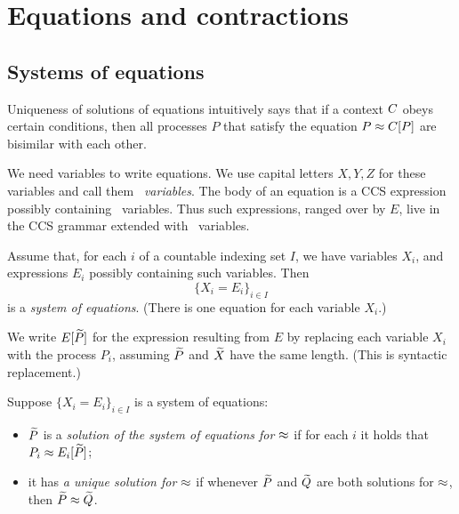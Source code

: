 \section{Equations and contractions}
\label{s:eq}



\subsection{Systems of  equations}
\label{ss:SysEq}

             
Uniqueness of  solutions of equations \cite{Mil89} intuitively says that if  a context $C$ obeys
certain  conditions, 
then all processes $P$  that satisfy the equation $ P \approx C [P]$ are
bisimilar with each other.

We need variables to write equations. We  use
 capital
letters  $X,Y,Z$
 for  these variables and call them \emph{\behav\  variables}.
 The body of an equation is a CCS expression
possibly containing \behav\  variables. Thus such expressions, ranged
over by $E$, live in the CCS
grammar extended with \behav\  variables.

  
\begin{definition}
Assume that, for each $i$ of 
 a countable indexing set $I$, we have variables $X_i$, and expressions
$E_i$ possibly containing  such variables. 
Then 
$$\{  X_i = E_i\}_{i\in I}$$
is 
  a \emph{system of equations}. (There is one equation for each variable $X_i$.)
\end{definition}

We write $E[\widetilde P]$ for the expression resulting from $E$ by
replacing each variable $X_i$   with the process $P_i$, assuming
$\widetilde P$ and $\widetilde X$ have the same length. (This is syntactic
replacement.) 
\begin{definition}
Suppose  $\{  X_i = E_i\}_{i\in I}$ is a system of equations: 
\begin{itemize}
\item
 $\widetilde P$ is a \emph{solution of the 
system of equations  for $\approx$} 
if for each $i$ it holds
that $P_i \approx E_i [\widetilde P]$;

\item it %
 has \emph{a unique solution for $\approx$}  if whenever 
 $\widetilde P$ and $\widetilde Q$ are both solutions for $\approx$, then $\widetilde P \approx
 \widetilde Q$. 
\end{itemize} 
 \end{definition} 




